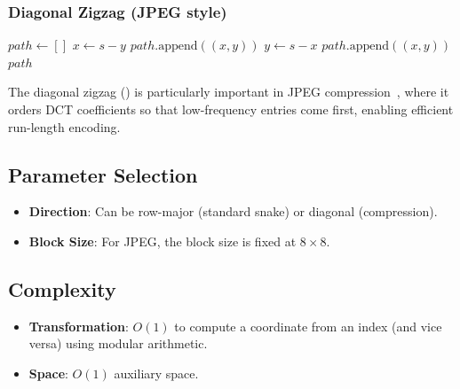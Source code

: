 \subsubsection{Diagonal Zigzag (JPEG style)}
\begin{algorithm}
\caption{Diagonal Zigzag Scan (JPEG)}\label{alg:diagonal_zigzag}
\begin{algorithmic}
    \State $path \gets []$
                \State $x \gets s - y$
                    \State $path.\text{append}((x, y))$
                \EndIf
            \EndFor
        \Else
                \State $y \gets s - x$
                    \State $path.\text{append}((x, y))$
                \EndIf
            \EndFor
        \EndIf
    \EndFor
    \Return $path$
\EndFunction
\end{algorithmic}
\end{algorithm}
The diagonal zigzag () is particularly important in JPEG compression~\cite{pennebaker1992}, where it orders DCT coefficients so that low-frequency entries come first, enabling efficient run-length encoding.

\subsection{Parameter Selection}
\begin{itemize}
    \item \textbf{Direction}: Can be row-major (standard snake) or diagonal (compression).
    \item \textbf{Block Size}: For JPEG, the block size is fixed at $8 \times 8$.
\end{itemize}

\subsection{Complexity}
\begin{itemize}
    \item \textbf{Transformation}: $O(1)$ to compute a coordinate from an index (and vice versa) using modular arithmetic.
    \item \textbf{Space}: $O(1)$ auxiliary space.
\end{itemize}

